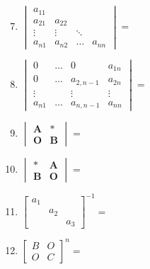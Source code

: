 \documentclass[a4paper,12pt]{article}
\begin{document}
    \hfill
    \begin{minipage}[t]{0.30\textwidth}
        \begin{enumerate}[leftmargin=0.2em, itemsep=1.1em]
            \setcounter{enumi}{6}
            \item $\begin{vmatrix}
                       a_{11} &        &        &        \\
                       a_{21} & a_{22} &        &        \\
                       \vdots & \vdots & \ddots &        \\
                       a_{n1} & a_{n2} & \dots  & a_{nn}
            \end{vmatrix} =$
            \item $\begin{vmatrix}
                       0      & \dots & 0         & a_{1n} \\
                       0      & \dots & a_{2,n-1} & a_{2n} \\
                       \vdots &       & \vdots    & \vdots \\
                       a_{n1} & \dots & a_{n,n-1} & a_{nn}
            \end{vmatrix} =$
            \item $\begin{vmatrix}
                       \mathbf{A} & *          \\
                       \mathbf{O} & \mathbf{B}
            \end{vmatrix} =$
            \item $\begin{vmatrix}
                       *          & \mathbf{A} \\
                       \mathbf{B} & \mathbf{O}
            \end{vmatrix} = $
            \item $\begin{bmatrix}
                       a_1 &     &     \\
                       & a_2 &     \\
                       &     & a_3
            \end{bmatrix}^{-1} =$
            \item $\begin{bmatrix}
                       B & O \\
                       O & C
            \end{bmatrix}^n =$
        \end{enumerate}
    \end{minipage}
\end{document}

